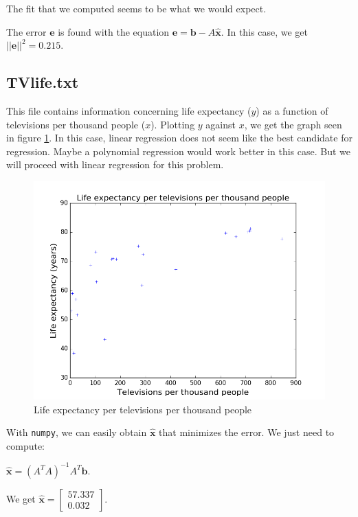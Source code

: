 \documentclass[]{article}
\begin{document}
The fit that we computed seems to be what we would expect.

The error $\textbf{e}$ is found with the equation $\textbf{e} = \textbf{b} - A\widehat{\textbf{x}}$. In this case, we get $||\textbf{e}||^2 = 0.215$.

\newpage
\subsection*{TVlife.txt}
This file contains information concerning life expectancy ($y$) as a function of televisions per thousand people ($x$). Plotting $y$ against $x$, we get the graph seen in figure \ref{TV_plain}. In this case, linear regression does not seem like the best candidate for regression. Maybe a polynomial regression would work better in this case. But we will proceed with linear regression for this problem.

\begin{figure}[h]
\centering
\includegraphics{TV_plain.png}
\caption{Life expectancy per televisions per thousand people}
\label{TV_plain}
\end{figure}

With \texttt{numpy}, we can easily obtain $\widehat{\textbf{x}}$ that minimizes the error. We just need to compute:

$\widehat{\textbf{x}} = (A^TA)^{-1}A^T\textbf{b}$.

We get $\widehat{\textbf{x}} = \left[\begin{smallmatrix}57.337\\0.032\end{smallmatrix}\right]$.
\end{document}
